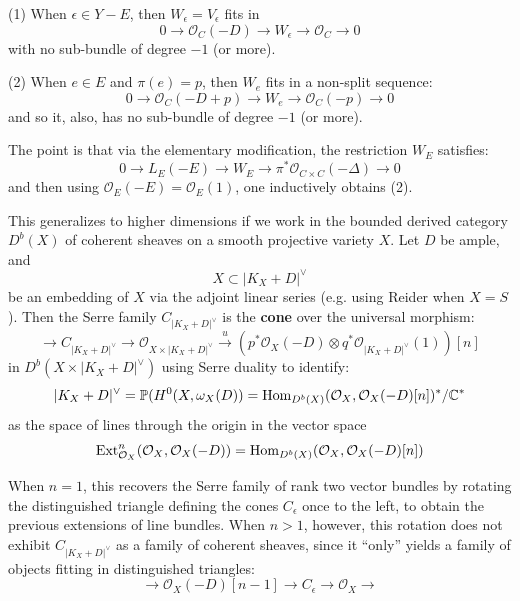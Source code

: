 \documentclass{amsart}
\begin{document}
\medskip

(1) When $\epsilon \in Y - E$, then $W_\epsilon = V_\epsilon$ fits in 
\[ 0 \rightarrow {\mathcal O}_C(-D) \rightarrow W_\epsilon \rightarrow {\mathcal O}_C \rightarrow 0\] 
with no sub-bundle of degree $-1$ (or more). 

\medskip


(2) When $e \in E$ and $\pi(e) = p$, then $W_e$ fits in a non-split sequence: 
\[ 0 \rightarrow {\mathcal O}_C(-D + p) \rightarrow W_e \rightarrow {\mathcal O}_C(-p) \rightarrow 0 \] 
and so it, also, has no sub-bundle of degree $-1$ (or more). 

\medskip


The point is that via the elementary modification, the restriction $W_E$ satisfies: 
\[ 0 \rightarrow L_E(-E) \rightarrow W_E \rightarrow \pi^* {\mathcal O}_{C\times C}(-\Delta) \rightarrow 0 \] 
and then using ${\mathcal O}_E(-E) = {\mathcal O}_E(1)$, one inductively obtains (2).

\medskip

This generalizes to higher dimensions if we work in the bounded derived category $D^b(X)$ of coherent sheaves on 
a smooth projective variety $X$. 
Let $D$ be ample, and 
\[ X \subset |K_X + D| ^\vee  \] 
be an embedding of $X$ via the adjoint linear series (e.g. using Reider when $X = S$). 
Then the  Serre family $C_{|K_X + D|^\vee}$  is the {\bf cone} over the universal morphism: 
\[ \rightarrow C_{|K_X + D|^\vee}  \rightarrow {\mathcal O}_{X \times |K_X + D|^\vee} \stackrel u \rightarrow \left( p^*{\mathcal O}_X(-D) \otimes q^* {\mathcal O}_{|K_X + D|^\vee}(1)\right) [n]  \]  
in $D^b(X \times |K_X + D|^\vee)$ using Serre duality to identify: 
\[ |K_X + D|^\vee = {\mathbb P}(H^0(X, \omega_X(D)) = \mbox{Hom}_{D^b(X)} ({\mathcal O}_X, {\mathcal O}_X(-D)[n])^*/{\mathbb C}^* \] 
as the space of lines through the origin in the vector space 
\[ \mbox{Ext}^n_{{\mathcal O}_X}({\mathcal O}_X, {\mathcal O}_X(-D)) = \mbox{Hom}_{D^b(X)} ({\mathcal O}_X, {\mathcal O}_X(-D)[n]) \] 

When $n = 1$, this recovers the Serre family of rank two vector bundles by rotating the distinguished 
triangle defining the cones $C_\epsilon$ once to the left, to obtain the previous extensions of line bundles. When $n > 1$, however, 
this rotation does not exhibit $C_{|K_X + D|^\vee}$ as a family of coherent sheaves, since it ``only'' yields a family of objects fitting in distinguished triangles:
\[  \rightarrow {\mathcal O}_X(-D)[n-1] \rightarrow C_\epsilon  \rightarrow {\mathcal O}_X \rightarrow  \] 
\end{document}
